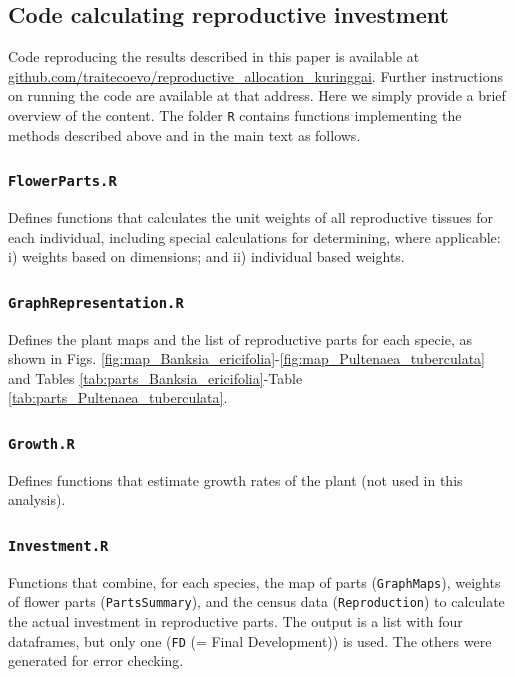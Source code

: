 \documentclass[10pt,twoside]{article}\usepackage[]{graphicx}\usepackage[]{color}
\begin{document}
\subsection{Code calculating reproductive investment}

Code reproducing the results described in this paper is available at \\ \href{https://github.com/traitecoevo/reproductive_allocation_kuringgai}{github.com/traitecoevo/reproductive\_allocation\_kuringgai}. Further instructions on running the code are available at that address. Here we simply provide a brief overview of the content. The folder \texttt{R} contains functions implementing the methods described above and in the main text as follows.

\subsubsection{\texttt{FlowerParts.R}}

Defines functions that calculates the unit weights of all reproductive tissues for each individual, including special calculations for determining,
where applicable: i)  weights based on dimensions; and ii) individual based weights.

\subsubsection{\texttt{GraphRepresentation.R}}

Defines the plant maps and the list of reproductive parts for each specie, as shown in Figs. \ref{fig:map_Banksia_ericifolia}-\ref{fig:map_Pultenaea_tuberculata} and Tables \ref{tab:parts_Banksia_ericifolia}-Table \ref{tab:parts_Pultenaea_tuberculata}.

\subsubsection{\texttt{Growth.R}}

Defines functions that estimate growth rates of the plant (not used in this analysis).

\subsubsection{\texttt{Investment.R}}

Functions that combine, for each species, the map of parts (\texttt{GraphMaps}), weights of flower parts (\texttt{PartsSummary}), and the census data (\texttt{Reproduction}) to calculate the actual investment in reproductive parts. The output is a list with four dataframes, but only one (\texttt{FD} (= Final Development)) is used. The others were generated for error checking.
\end{document}
